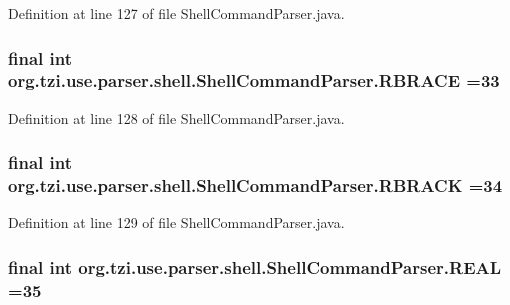 Definition at line 127 of file Shell\-Command\-Parser.\-java.

\hypertarget{classorg_1_1tzi_1_1use_1_1parser_1_1shell_1_1_shell_command_parser_a564bbbbe693e52fcd6192ab5bf8c9eb1}{
\subsubsection[{R\-B\-R\-A\-C\-E}]{\setlength{\rightskip}{0pt plus 5cm}final int org.\-tzi.\-use.\-parser.\-shell.\-Shell\-Command\-Parser.\-R\-B\-R\-A\-C\-E =33\hspace{0.3cm}{\ttfamily [static]}}}\label{classorg_1_1tzi_1_1use_1_1parser_1_1shell_1_1_shell_command_parser_a564bbbbe693e52fcd6192ab5bf8c9eb1}


Definition at line 128 of file Shell\-Command\-Parser.\-java.

\hypertarget{classorg_1_1tzi_1_1use_1_1parser_1_1shell_1_1_shell_command_parser_aef419100c59c1f618950355d0333def8}{
\subsubsection[{R\-B\-R\-A\-C\-K}]{\setlength{\rightskip}{0pt plus 5cm}final int org.\-tzi.\-use.\-parser.\-shell.\-Shell\-Command\-Parser.\-R\-B\-R\-A\-C\-K =34\hspace{0.3cm}{\ttfamily [static]}}}\label{classorg_1_1tzi_1_1use_1_1parser_1_1shell_1_1_shell_command_parser_aef419100c59c1f618950355d0333def8}


Definition at line 129 of file Shell\-Command\-Parser.\-java.

\hypertarget{classorg_1_1tzi_1_1use_1_1parser_1_1shell_1_1_shell_command_parser_a72b2182f3046d3b1677f77a72c633dbf}{
\subsubsection[{R\-E\-A\-L}]{\setlength{\rightskip}{0pt plus 5cm}final int org.\-tzi.\-use.\-parser.\-shell.\-Shell\-Command\-Parser.\-R\-E\-A\-L =35\hspace{0.3cm}{\ttfamily [static]}}}\label{classorg_1_1tzi_1_1use_1_1parser_1_1shell_1_1_shell_command_parser_a72b2182f3046d3b1677f77a72c633dbf}


